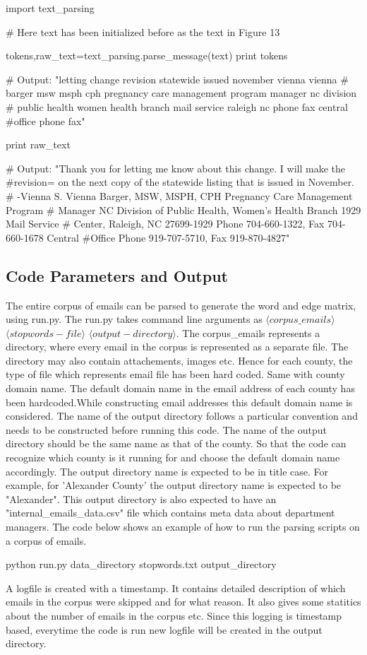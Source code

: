 \documentclass[fleqn]{MJDArticle}
\begin{document}
\begin{code}
import text_parsing

# Here text has been initialized before as the text in Figure 13

tokens,raw_text=text_parsing.parse_message(text)
print tokens

# Output: "letting change revision statewide issued november vienna vienna
# barger msw msph cph pregnancy care management program manager nc division
# public health women health branch mail service raleigh nc phone fax central 
#office phone fax"

print raw_text

# Output: "Thank you for letting me know about this change. I will make the 
#revision= on the next copy of the statewide listing that is issued in November.
# -Vienna S. Vienna Barger, MSW, MSPH, CPH Pregnancy Care Management Program
# Manager NC Division of Public Health, Women's Health Branch 1929 Mail Service
# Center, Raleigh, NC 27699-1929 Phone 704-660-1322, Fax 704-660-1678 Central 
#Office Phone 919-707-5710, Fax 919-870-4827"
\end{code}

\subsection{Code Parameters and Output}
The entire corpus of emails can be parsed to generate the word and edge matrix, using run.py. The run.py takes command line arguments as $\langle corpus\_emails \rangle$ $\langle stopwords-file \rangle$ $\langle output-directory \rangle$. The corpus\_emails represents a directory, where every email in the corpus is represented as a separate file. The directory may also contain attachements, images etc. Hence for each county, the type of file which represents email file has been hard coded. Same with county domain name. The default domain name in the email address of each county has been hardcoded.While constructing email addresses this default domain name is considered.  The name of the output directory follows a particular convention and needs to be constructed before running this code. The name of the output directory should be the same name as that of the county. So that the code can recognize which county is it running for and choose the default domain name accordingly. The output directory name is expected to be in title case. For example, for 'Alexander County' the output directory name is expected to be "Alexander". This output directory is also expected to have an "internal\_emails\_data.csv" file which contains meta data about department managers. 
The code below shows an example of how to run the parsing scripts on a corpus of emails.
\begin{code}
python run.py data_directory stopwords.txt output_directory
\end{code}
A logfile is created with a timestamp. It contains detailed description of which emails in the corpus were skipped and for what reason. It also gives some statitics about the number of emails in the corpus etc. Since this logging is timestamp based, everytime the code is run new logfile will be created in the output directory. 
\end{document}
